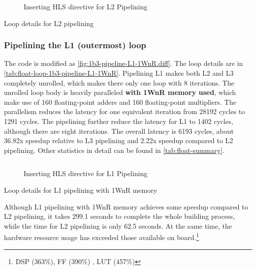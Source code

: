 \begin{figure}[ht!]
    \centering
    \inputminted[firstline=3]{diff}{program/1b2-pipeline-L2.diff}
    \caption{Inserting HLS directive for L2 Pipelining}\label{fig:1b2-pipeline-L2.diff}
\end{figure}

\begin{table}[ht!]
    \caption{Loop details for L2 pipelining}
    \label{tab:float-loop-1b2-pipeline-L2}
    \centering
    
\end{table}

\subsubsection{Pipelining the L1 (outermost) loop}\label{sec:1bL1}

The code is modified as \autoref{fig:1b3-pipeline-L1-1WnR.diff}.
The loop details are in \autoref{tab:float-loop-1b3-pipeline-L1-1WnR}.
Pipelining L1 makes both L2 and L3 completely unrolled, which makes there only one loop with 8 iterations.
The unrolled loop body is heavily paralleled \textbf{with 1WnR memory used}, which make use of 160 floating-point adders and 160 floating-point multipliers.
The parallelism reduces the latency for one equivalent iteration from 28192 cycles to 1291 cycles.
The pipelining further reduce the latency for L1 to 1402 cycles, although there are eight iterations.
The overall latency is 6193 cycles, about 36.82x speedup relative to L3 pipelining and 2.22x speedup compared to L2 pipelining.
Other statistics in detail can be found in \autoref{tab:float-summary}.

\begin{figure}[ht!]
    \centering
    \inputminted[firstline=3]{diff}{program/1b3-pipeline-L1-1WnR.diff}
    \caption{Inserting HLS directive for L1 Pipelining}\label{fig:1b3-pipeline-L1-1WnR.diff}
\end{figure}

\begin{table}[ht!]
    \caption{Loop details for L1 pipelining with 1WnR memory}
    \label{tab:float-loop-1b3-pipeline-L1-1WnR}
    \centering
    
\end{table}

Although L1 pipelining with 1WnR memory achieves some speedup compared to L2 pipelining, it takes 299.1 seconds to complete the whole building process, while the time for L2 pipelining is only 62.5 seconds.
At the same time, the hardware resource usage has exceeded those available on board.\footnote{
    DSP (363\%), FF (390\%) , LUT (457\%)
}

